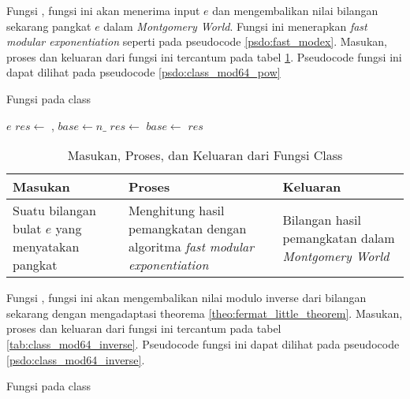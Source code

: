 \newpage

Fungsi , fungsi ini akan menerima input $ e $ dan mengembalikan nilai bilangan sekarang pangkat $ e $ dalam \textit{Montgomery World}. Fungsi ini menerapkan \textit{fast modular exponentiation} seperti pada pseudocode \ref{psdo:fast_modex}. Masukan, proses dan keluaran dari fungsi ini tercantum pada tabel \ref{tab:class_mod64_pow}. Pseudocode fungsi ini dapat dilihat pada pseudocode \ref{psdo:class_mod64_pow}

\begin{algorithm}
	\caption{Fungsi  pada class }
	\label{psdo:class_mod64_pow}
	\begin{algorithmic}[1]
		\Require $ e $
		\State $ res \leftarrow $  , $ base \leftarrow n\_ $
			 \State $ res \leftarrow $ \EndIf
			\State $ base \leftarrow $
		\EndFor
		\State \Return $ res $
	\end{algorithmic}
\end{algorithm}

\begin{table}[]
	\Centering
	\begin{tabular}{|p{3cm}|p{3cm}|p{3cm}|}
	\hline
	Masukan                                                      & Proses                                   & Keluaran \\ \hline
	Suatu bilangan bulat $e$ yang menyatakan pangkat & Menghitung hasil pemangkatan dengan algoritma \textit{fast modular exponentiation} & Bilangan hasil pemangkatan dalam \textit{Montgomery World} \\ \hline
	\end{tabular}
	\caption{Masukan, Proses, dan Keluaran dari Fungsi  Class }
	\label{tab:class_mod64_pow}
\end{table}

\newpage

Fungsi , fungsi ini akan mengembalikan nilai modulo inverse dari bilangan sekarang dengan mengadaptasi theorema \ref{theo:fermat_little_theorem}. Masukan, proses dan keluaran dari fungsi ini tercantum pada tabel \ref{tab:class_mod64_inverse}. Pseudocode fungsi ini dapat dilihat pada pseudocode \ref{psdo:class_mod64_inverse}.

\begin{algorithm}
	\caption{Fungsi  pada class }
	\label{psdo:class_mod64_inverse}
	\begin{algorithmic}[1]
		\State \Return {}
	\end{algorithmic}
\end{algorithm}

